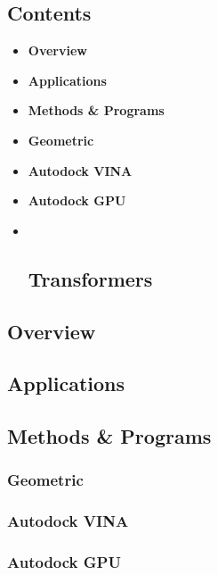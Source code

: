 \hypertarget{contents-9}{%
\subsection{Contents}\label{contents-9}}

\begin{itemize}
\item
  \textbf{Overview}
\item
  \textbf{Applications}
\item
  \textbf{Methods \& Programs}
\item
  \textbf{Geometric}
\item
  \textbf{Autodock VINA}
\item
  \textbf{Autodock GPU}
\item ~
  \hypertarget{transformers}{%
  \subsection{\texorpdfstring{\textbf{Transformers}}{Transformers}}\label{transformers}}
\end{itemize}

\hypertarget{overview-3}{%
\subsection{Overview}\label{overview-3}}

\hypertarget{applications}{%
\subsection{Applications}\label{applications}}

\hypertarget{methods-programs}{%
\subsection{Methods \& Programs}\label{methods-programs}}

\hypertarget{geometric}{%
\subsubsection{Geometric}\label{geometric}}

\hypertarget{autodock-vina}{%
\subsubsection{Autodock VINA}\label{autodock-vina}}

\hypertarget{autodock-gpu}{%
\subsubsection{Autodock GPU}\label{autodock-gpu}}

